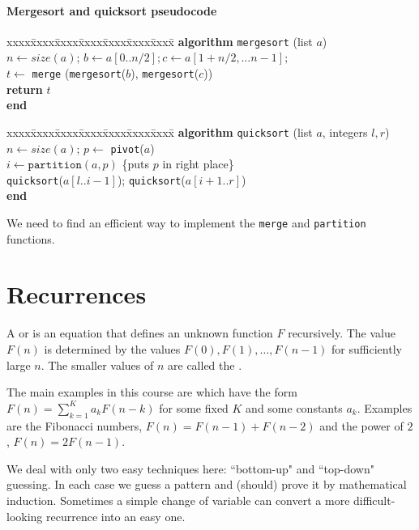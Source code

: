\begin{frame}
\frametitle{Mergesort and quicksort pseudocode}
\begin{tabbing}
xxxx\=xxxx\=xxxx\=xxxx\=xxxx\=xxxx\=xxxx\= \kill
\textbf{algorithm} \texttt{mergesort} (list $a$) \\
$n \gets size(a)$; $b \gets a[0..n/2]; c \gets a[1+n/2, \dots n-1];$ \\
$t \gets $ \texttt{merge} (\texttt{mergesort}($b$), \texttt{mergesort}($c$)) \\
\textbf{return} $t$ \\
\textbf{end}
\end{tabbing}
\begin{tabbing}
xxxx\=xxxx\=xxxx\=xxxx\=xxxx\=xxxx\=xxxx\= \kill
\textbf{algorithm} \texttt{quicksort} (list $a$, integers $l, r$) \\
$n \gets size(a)$; $p \gets$ \texttt{pivot}($a$)\\
$i \gets \texttt{partition}(a, p)$ \quad \{puts $p$ in right place\} \\
\texttt{quicksort}($a[l..i-1]$); \texttt{quicksort}($a[i+1..r]$)\\
\textbf{end}
\end{tabbing}

We need to find an efficient way to implement the \texttt{merge} and 
\texttt{partition} functions.
\end{frame}
\fi

\chapter{Recurrences} %
\begin{Definition}
A  or  is an
equation that defines an unknown function $F$ recursively. 
The value $F(n)$ is determined by the values $F(0), F(1), \dots, F(n-1)$ for
sufficiently large $n$. The smaller values of $n$ are called the
. 
\end{Definition}

The main examples  in this course are  which have the form 
$F(n) = \sum_{k=1}^K a_k F(n - k)$ for some fixed $K$ and some constants $a_k$. 
Examples are the Fibonacci numbers, $F(n) = F(n-1) + F(n-2)$ and the power of $2$, $F(n) = 2F(n-1)$.

We deal with only two easy techniques here: ``bottom-up" and ``top-down" guessing. 
In each case we guess a pattern and (should) prove it by mathematical induction. 
Sometimes a simple change of variable can convert a more difficult-looking recurrence into an easy one. 

